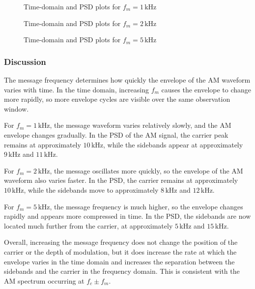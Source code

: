 \documentclass[../../main.tex]{subfiles}
\begin{document}
\begin{figure}[htbp]
    \centering
    \caption{Time-domain and PSD plots for $f_m=1\,\text{kHz}$}
\end{figure}

\begin{figure}[htbp]
    \centering
    \caption{Time-domain and PSD plots for $f_m=2\,\text{kHz}$}
\end{figure}

\begin{figure}[htbp]
    \centering
    \caption{Time-domain and PSD plots for $f_m=5\,\text{kHz}$}
\end{figure}

\FloatBarrier

\subsubsection*{Discussion}

The message frequency determines how quickly the envelope of the AM waveform varies with time. In the time domain, increasing $f_m$ causes the envelope to change more rapidly, so more envelope cycles are visible over the same observation window.

For $f_m = 1\,\text{kHz}$, the message waveform varies relatively slowly, and the AM envelope changes gradually. In the PSD of the AM signal, the carrier peak remains at approximately $10\,\text{kHz}$, while the sidebands appear at approximately $9\,\text{kHz}$ and $11\,\text{kHz}$.

For $f_m = 2\,\text{kHz}$, the message oscillates more quickly, so the envelope of the AM waveform also varies faster. In the PSD, the carrier remains at approximately $10\,\text{kHz}$, while the sidebands move to approximately $8\,\text{kHz}$ and $12\,\text{kHz}$.

For $f_m = 5\,\text{kHz}$, the message frequency is much higher, so the envelope changes rapidly and appears more compressed in time. In the PSD, the sidebands are now located much further from the carrier, at approximately $5\,\text{kHz}$ and $15\,\text{kHz}$.

Overall, increasing the message frequency does not change the position of the carrier or the depth of modulation, but it does increase the rate at which the envelope varies in the time domain and increases the separation between the sidebands and the carrier in the frequency domain. This is consistent with the AM spectrum occurring at $f_c \pm f_m$.
\end{document}

